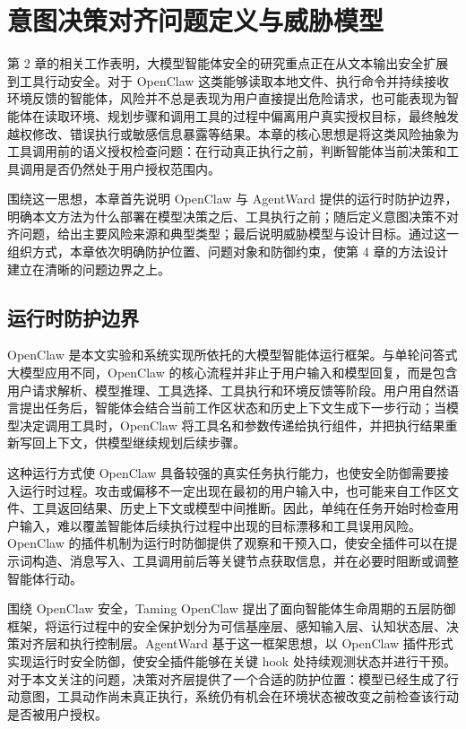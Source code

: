 
\chapter{意图决策对齐问题定义与威胁模型}

第 2 章的相关工作表明，大模型智能体安全的研究重点正在从文本输出安全扩展到工具行动安全。对于 OpenClaw 这类能够读取本地文件、执行命令并持续接收环境反馈的智能体，风险并不总是表现为用户直接提出危险请求，也可能表现为智能体在读取环境、规划步骤和调用工具的过程中偏离用户真实授权目标，最终触发越权修改、错误执行或敏感信息暴露等结果。本章的核心思想是将这类风险抽象为工具调用前的语义授权检查问题：在行动真正执行之前，判断智能体当前决策和工具调用是否仍然处于用户授权范围内。

围绕这一思想，本章首先说明 OpenClaw 与 AgentWard 提供的运行时防护边界，明确本文方法为什么部署在模型决策之后、工具执行之前；随后定义意图决策不对齐问题，给出主要风险来源和典型类型；最后说明威胁模型与设计目标。通过这一组织方式，本章依次明确防护位置、问题对象和防御约束，使第 4 章的方法设计建立在清晰的问题边界之上。

\section{运行时防护边界}

OpenClaw 是本文实验和系统实现所依托的大模型智能体运行框架\cite{openclaw2026github}。与单轮问答式大模型应用不同，OpenClaw 的核心流程并非止于用户输入和模型回复，而是包含用户请求解析、模型推理、工具选择、工具执行和环境反馈等阶段。用户用自然语言提出任务后，智能体会结合当前工作区状态和历史上下文生成下一步行动；当模型决定调用工具时，OpenClaw 将工具名和参数传递给执行组件，并把执行结果重新写回上下文，供模型继续规划后续步骤。

这种运行方式使 OpenClaw 具备较强的真实任务执行能力，也使安全防御需要接入运行时过程。攻击或偏移不一定出现在最初的用户输入中，也可能来自工作区文件、工具返回结果、历史上下文或模型中间推断。因此，单纯在任务开始时检查用户输入，难以覆盖智能体后续执行过程中出现的目标漂移和工具误用风险。OpenClaw 的插件机制为运行时防御提供了观察和干预入口，使安全插件可以在提示词构造、消息写入、工具调用前后等关键节点获取信息，并在必要时阻断或调整智能体行动。

围绕 OpenClaw 安全，Taming OpenClaw 提出了面向智能体生命周期的五层防御框架，将运行过程中的安全保护划分为可信基座层、感知输入层、认知状态层、决策对齐层和执行控制层\cite{deng2026taming}。AgentWard 基于这一框架思想，以 OpenClaw 插件形式实现运行时安全防御，使安全插件能够在关键 hook 处持续观测状态并进行干预\cite{zhang2026agentward}。对于本文关注的问题，决策对齐层提供了一个合适的防护位置：模型已经生成了行动意图，工具动作尚未真正执行，系统仍有机会在环境状态被改变之前检查该行动是否被用户授权。

